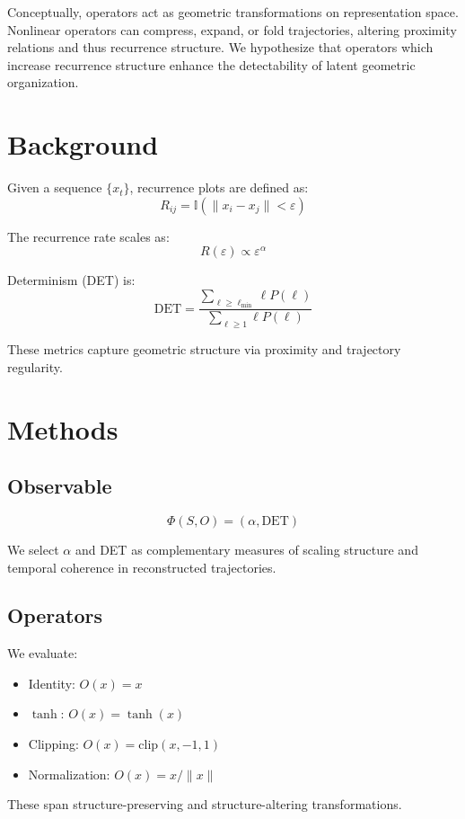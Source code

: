 \documentclass[11pt]{article}
\begin{document}
Conceptually, operators act as geometric transformations on representation space. Nonlinear operators can compress, expand, or fold trajectories, altering proximity relations and thus recurrence structure. We hypothesize that operators which increase recurrence structure enhance the detectability of latent geometric organization.

\section{Background}

Given a sequence $\{x_t\}$, recurrence plots are defined as:
\[
	R_{ij} = \mathbb{I}(\|x_i - x_j\| < \varepsilon)
\]

The recurrence rate scales as:
\[
	R(\varepsilon) \propto \varepsilon^\alpha
\]

Determinism (DET) is:
\[
	\mathrm{DET} = \frac{\sum_{\ell \ge \ell_{\min}} \ell P(\ell)}{\sum_{\ell \ge 1} \ell P(\ell)}
\]

These metrics capture geometric structure via proximity and trajectory regularity.

\section{Methods}

\subsection{Observable}

\[
	\Phi(S, O) = (\alpha, \mathrm{DET})
\]

We select $\alpha$ and DET as complementary measures of scaling structure and temporal coherence in reconstructed trajectories.

\subsection{Operators}

We evaluate:
\begin{itemize}
	\item Identity: $O(x)=x$
	\item $\tanh$: $O(x)=\tanh(x)$
	\item Clipping: $O(x)=\mathrm{clip}(x, -1, 1)$
	\item Normalization: $O(x)=x/\|x\|$
\end{itemize}

These span structure-preserving and structure-altering transformations.
\end{document}
